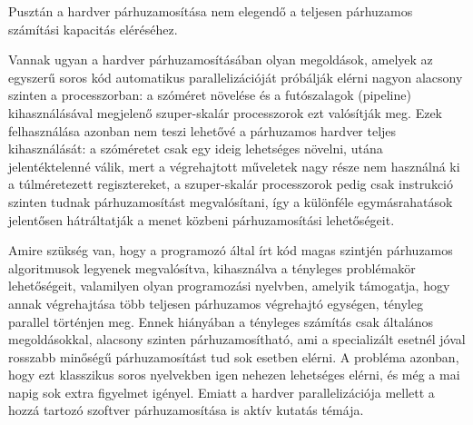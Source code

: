Pusztán a hardver párhuzamosítása nem elegendő a teljesen párhuzamos számítási kapacitás eléréséhez.

Vannak ugyan a hardver párhuzamosításában olyan megoldások, amelyek az egyszerű soros kód automatikus parallelizációját próbálják elérni nagyon alacsony szinten a processzorban: a szóméret növelése és a futószalagok (\foreignlanguage{english}{pipeline}) kihasználásával megjelenő szuper-skalár processzorok ezt valósítják meg.
Ezek felhasználása azonban nem teszi lehetővé a párhuzamos hardver teljes kihasználását: a szóméretet csak egy ideig lehetséges növelni, utána jelentéktelenné válik, mert a végrehajtott műveletek nagy része nem használná ki a túlméretezett regisztereket, a szuper-skalár processzorok pedig csak instrukció szinten tudnak párhuzamosítást megvalósítani, így a különféle egymásrahatások jelentősen hátráltatják a menet közbeni párhuzamosítási lehetőségeit.

Amire szükség van, hogy a programozó által írt kód magas szintjén párhuzamos algoritmusok legyenek megvalósítva, kihasználva a tényleges problémakör lehetőségeit, valamilyen olyan programozási nyelvben, amelyik támogatja, hogy annak végrehajtása több teljesen párhuzamos végrehajtó egységen, tényleg parallel történjen meg.
Ennek hiányában a tényleges számítás csak általános megoldásokkal, alacsony szinten párhuzamosítható, ami a specializált esetnél jóval rosszabb minőségű párhuzamosítást tud sok esetben elérni.
A probléma azonban, hogy ezt klasszikus soros nyelvekben igen nehezen lehetséges elérni, és még a mai napig sok extra figyelmet igényel.
Emiatt a hardver parallelizációja mellett a hozzá tartozó szoftver párhuzamosítása is aktív kutatás témája.

